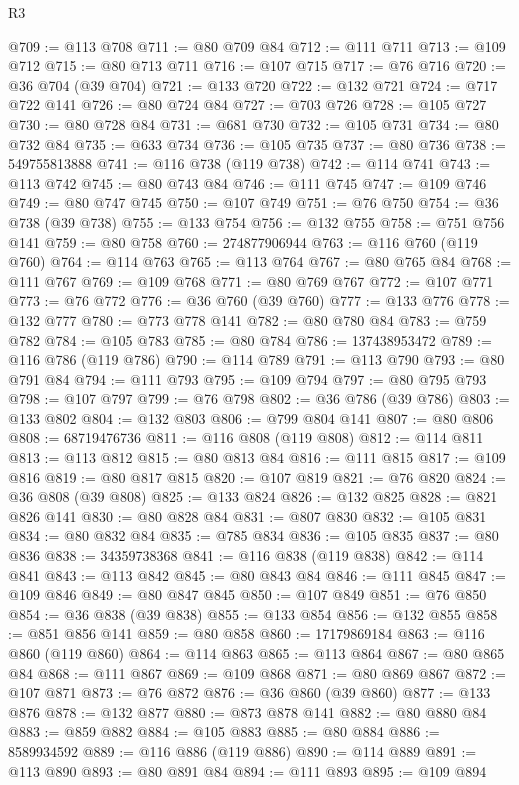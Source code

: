 \begin{lexlean}{R3}
\begin{coremodule}
@709 := @113 @708
@711 := @80 @709 @84
@712 := @111 @711
@713 := @109 @712
@715 := @80 @713 @711
@716 := @107 @715
@717 := @76 @716
@720 := @36 @704 (@39 @704)
@721 := @133 @720
@722 := @132 @721
@724 := @717 @722 @141
@726 := @80 @724 @84
@727 := @703 @726
@728 := @105 @727
@730 := @80 @728 @84
@731 := @681 @730
@732 := @105 @731
@734 := @80 @732 @84
@735 := @633 @734
@736 := @105 @735
@737 := @80 @736
@738 := 549755813888
@741 := @116 @738 (@119 @738)
@742 := @114 @741
@743 := @113 @742
@745 := @80 @743 @84
@746 := @111 @745
@747 := @109 @746
@749 := @80 @747 @745
@750 := @107 @749
@751 := @76 @750
@754 := @36 @738 (@39 @738)
@755 := @133 @754
@756 := @132 @755
@758 := @751 @756 @141
@759 := @80 @758
@760 := 274877906944
@763 := @116 @760 (@119 @760)
@764 := @114 @763
@765 := @113 @764
@767 := @80 @765 @84
@768 := @111 @767
@769 := @109 @768
@771 := @80 @769 @767
@772 := @107 @771
@773 := @76 @772
@776 := @36 @760 (@39 @760)
@777 := @133 @776
@778 := @132 @777
@780 := @773 @778 @141
@782 := @80 @780 @84
@783 := @759 @782
@784 := @105 @783
@785 := @80 @784
@786 := 137438953472
@789 := @116 @786 (@119 @786)
@790 := @114 @789
@791 := @113 @790
@793 := @80 @791 @84
@794 := @111 @793
@795 := @109 @794
@797 := @80 @795 @793
@798 := @107 @797
@799 := @76 @798
@802 := @36 @786 (@39 @786)
@803 := @133 @802
@804 := @132 @803
@806 := @799 @804 @141
@807 := @80 @806
@808 := 68719476736
@811 := @116 @808 (@119 @808)
@812 := @114 @811
@813 := @113 @812
@815 := @80 @813 @84
@816 := @111 @815
@817 := @109 @816
@819 := @80 @817 @815
@820 := @107 @819
@821 := @76 @820
@824 := @36 @808 (@39 @808)
@825 := @133 @824
@826 := @132 @825
@828 := @821 @826 @141
@830 := @80 @828 @84
@831 := @807 @830
@832 := @105 @831
@834 := @80 @832 @84
@835 := @785 @834
@836 := @105 @835
@837 := @80 @836
@838 := 34359738368
@841 := @116 @838 (@119 @838)
@842 := @114 @841
@843 := @113 @842
@845 := @80 @843 @84
@846 := @111 @845
@847 := @109 @846
@849 := @80 @847 @845
@850 := @107 @849
@851 := @76 @850
@854 := @36 @838 (@39 @838)
@855 := @133 @854
@856 := @132 @855
@858 := @851 @856 @141
@859 := @80 @858
@860 := 17179869184
@863 := @116 @860 (@119 @860)
@864 := @114 @863
@865 := @113 @864
@867 := @80 @865 @84
@868 := @111 @867
@869 := @109 @868
@871 := @80 @869 @867
@872 := @107 @871
@873 := @76 @872
@876 := @36 @860 (@39 @860)
@877 := @133 @876
@878 := @132 @877
@880 := @873 @878 @141
@882 := @80 @880 @84
@883 := @859 @882
@884 := @105 @883
@885 := @80 @884
@886 := 8589934592
@889 := @116 @886 (@119 @886)
@890 := @114 @889
@891 := @113 @890
@893 := @80 @891 @84
@894 := @111 @893
@895 := @109 @894

\end{coremodule}
\end{lexlean}
